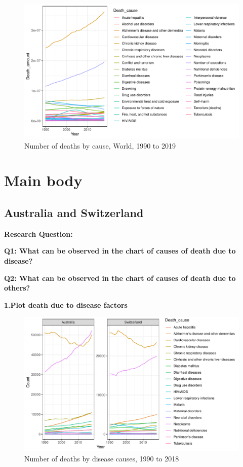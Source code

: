 \documentclass[11pt,a4paper,]{article}
\begin{document}
\begin{figure}
\centering
\includegraphics{Assignment4_files/figure-latex/worldplot-1.pdf}
\caption{\label{fig:worldplot}Number of deaths by cause, World, 1990 to 2019}
\end{figure}

\clearpage

\hypertarget{main-body}{%
\section{Main body}\label{main-body}}

\hypertarget{australia-and-switzerland}{%
\subsection{Australia and Switzerland}\label{australia-and-switzerland}}

\textbf{Research Question:}

\textbf{Q1: What can be observed in the chart of causes of death due to disease?}

\textbf{Q2: What can be observed in the chart of causes of death due to others?}

\textbf{1.Plot death due to disease factors}

\begin{figure}
\centering
\includegraphics{Assignment4_files/figure-latex/diseaseplot-1.pdf}
\caption{\label{fig:diseaseplot}Number of deaths by disease causes, 1990 to 2018}
\end{figure}
\end{document}
